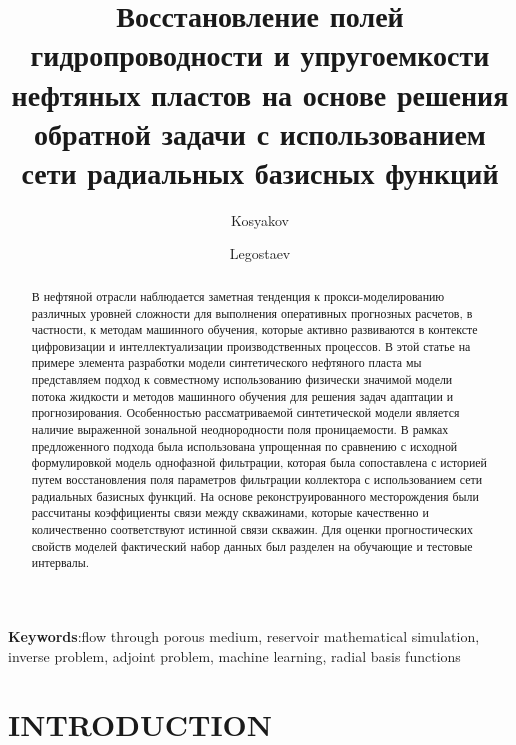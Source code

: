 \documentclass{article}
\begin{document}
\title{Восстановление полей гидропроводности и упругоемкости нефтяных пластов на основе решения обратной задачи с использованием сети радиальных базисных функций} %
\author{Kosyakov} %
\author{Legostaev}




\begin{abstract} %
В нефтяной отрасли наблюдается заметная тенденция к прокси-моделированию различных уровней сложности для выполнения оперативных прогнозных расчетов, в частности, к методам машинного обучения, которые активно развиваются в контексте цифровизации и интеллектуализации производственных процессов. В этой статье на примере элемента разработки модели синтетического нефтяного пласта мы представляем подход к совместному использованию физически значимой модели потока жидкости и методов машинного обучения для решения задач адаптации и прогнозирования. Особенностью рассматриваемой синтетической модели является наличие выраженной зональной неоднородности поля проницаемости. В рамках предложенного подхода была использована упрощенная по сравнению с исходной формулировкой модель однофазной фильтрации, которая была сопоставлена с историей путем восстановления поля параметров фильтрации коллектора с использованием сети радиальных базисных функций. На основе реконструированного месторождения были рассчитаны коэффициенты связи между скважинами, которые качественно и количественно соответствуют истинной связи скважин. Для оценки прогностических свойств моделей фактический набор данных был разделен на обучающие и тестовые интервалы.
\end{abstract}

\textbf{Keywords}:flow through porous medium, reservoir mathematical simulation, inverse problem, adjoint problem, machine learning, radial basis functions%

\maketitle

\section{INTRODUCTION}
\end{document}

